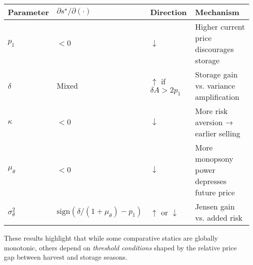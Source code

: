 \begin{table}[H]
\centering
\begin{tabular}{llll}
\toprule
\textbf{Parameter} & \(\partial s^{\star}/\partial(\cdot)\) & \textbf{Direction} & \textbf{Mechanism} \\
\midrule
\(p_1\) & \(< 0\) & \(\downarrow\) & Higher current price discourages storage \\
\(\delta\) & Mixed & \(\uparrow\) if \(\delta A > 2p_1\) & Storage gain vs. variance amplification \\
\(\kappa\) & \(< 0\) & \(\downarrow\) & More risk aversion → earlier selling \\
\(\mu_\theta\) & \(< 0\) & \(\downarrow\) & More monopsony power depresses future price \\
\(\sigma_\theta^2\) & \(\text{sign}(\delta/(1+\mu_\theta) - p_1)\) & \(\uparrow\) or \(\downarrow\) & Jensen gain vs. added risk \\
\bottomrule
\end{tabular}
\end{table}

These results highlight that while some comparative statics are globally monotonic, others depend on \textit{threshold conditions} shaped by the relative price gap between harvest and storage seasons.
